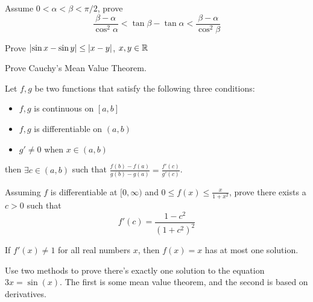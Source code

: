 \documentclass[Calculus 1 Recitation.tex]{subfiles}
\begin{document}
\begin{myleftlinebox}
	Assume $0<\alpha<\beta<\pi/2$, prove 
	\[\frac{\beta-\alpha}{\cos^2\alpha}<\tan\beta-\tan\alpha<\frac{\beta-\alpha}{\cos^2\beta}\]
	\tcblower
	\vspace{2em}	
\end{myleftlinebox}

\begin{myleftlinebox}
	Prove $\left\vert\sin x-\sin y\right\vert \leq \left\vert x-y\right\vert$, $x,y\in\mathbb{R}$
	\tcblower
	\vspace{2em}	
\end{myleftlinebox}

\begin{myleftlinebox}
	Prove Cauchy's Mean Value Theorem. 
	\begin{theorem}
		Let $f,g$ be two functions that satisfy the following three conditions:
		\begin{itemize}
			\item $f,g$ is continuous on $[a,b]$
			\item $f,g$ is differentiable on $(a,b)$
			\item $g'\neq0$ when $x\in(a,b)$
		\end{itemize}
		then $\exists c\in(a,b)$ such that $\frac{f(b)-f(a)}{g(b)-g(a)}=\frac{f'(c)}{g'(c)}$.
	\end{theorem}
	\tcblower
	\vspace{2em}	
\end{myleftlinebox}

\begin{myleftlinebox}
	Assuming $f$ is differentiable at $[0,\infty)$ and $0\leq f(x)\leq \frac{x}{1+x^2}$, prove there exists a $c>0$ such that
	\[f'(c)=\frac{1-c^2}{(1+c^2)^2}\]
	\tcblower
	\vspace{2em}
\end{myleftlinebox}

\begin{myleftlinebox}
	If $f'(x)\neq 1$ for all real numbers $x$, then $f(x)=x$ has at most one solution.
	\tcblower
	\vspace{2em}
\end{myleftlinebox}

\begin{myleftlinebox}
	Use two methods to prove there's exactly one solution to the equation $3x=\sin(x)$. The first is some mean value theorem, and the second is based on derivatives.
	\tcblower
	\vspace{2em}	
\end{myleftlinebox}
\end{document}

